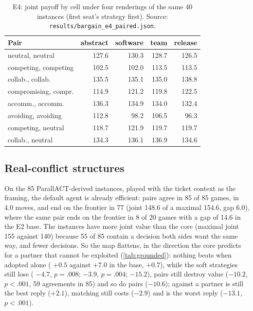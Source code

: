 \begin{table}[t]
\caption{E4: joint payoff by cell under four renderings of the same 40 instances (first seat's strategy first). Source: \texttt{results/bargain\_e4\_paired.json}.}
\label{tab:e4}
\centering\small\setlength{\tabcolsep}{3.5pt}
\begin{tabular}{@{}l rrrr@{}}
\toprule
Pair & abstract & software & team & release \\
\midrule
neutral, neutral       & 127.6 & 130.3 & 128.7 & 126.5 \\
competing, competing   & 102.5 & 102.0 & 113.5 & 113.5 \\
collab., collab.       & 135.5 & 135.1 & 135.0 & 138.8 \\
compromising, compr.   & 114.9 & 121.2 & 119.8 & 122.5 \\
accomm., accomm.       & 136.3 & 134.9 & 134.0 & 132.4 \\
avoiding, avoiding     & 112.8 &  98.2 & 106.5 &  96.3 \\
competing, neutral     & 118.7 & 121.9 & 119.7 & 119.7 \\
collab., neutral       & 134.3 & 136.1 & 136.9 & 134.6 \\
\bottomrule
\end{tabular}
\end{table}

\subsection{Real-conflict structures}
\label{sec:grounded}
On the 85 ParallACT-derived instances, played with the ticket context as the framing, the default agent is already efficient: \neutral{} pairs agree in 85 of 85 games, in 4.0 moves, and end on the frontier in 77 (joint 148.6 of a maximal 154.6, gap 6.0), where the same pair ends on the frontier in 8 of 20 games with a gap of 14.6 in the E2 base. The instances have more joint value than the core (maximal joint 155 against 140) because 55 of 85 contain a decision both sides want the same way, and fewer decisions. So the map flattens, in the direction the core predicts for a partner that cannot be exploited (\cref{tab:grounded}): nothing beats \neutral{} when adopted alone (\collaborating{} $+0.5$ against $+7.0$ in the base, \competing{} $+0.7$), while the soft strategies still lose (\compromising{} $-4.7$, $p = .008$; \accommodating{} $-3.9$, $p = .004$; \avoiding{} $-15.2$), \competing{} pairs still destroy value ($-10.2$, $p < .001$, 59 agreements in 85) and so do \avoiding{} pairs ($-10.6$); against a \competing{} partner \collaborating{} is still the best reply ($+2.1$), matching still costs ($-2.9$) and \avoiding{} is the worst reply ($-13.1$, $p < .001$).

